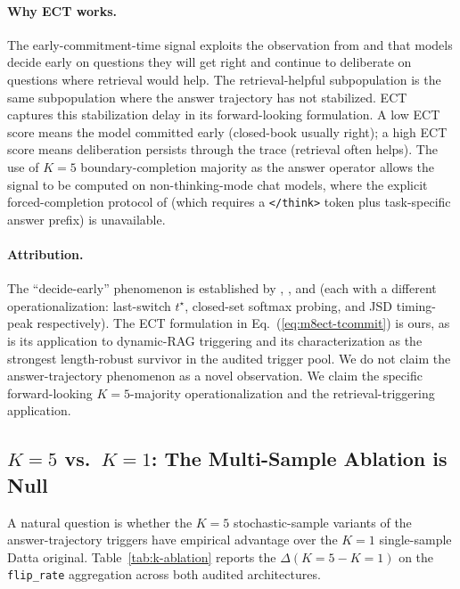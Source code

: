 \documentclass[11pt]{article}
\begin{document}
\paragraph{Why ECT works.} The early-commitment-time signal exploits the
observation from \citet{Datta_DecideEarlyExplainLater} and
\citet{Wang_ChainOfProbeCoTStepByStep} that models decide early on questions
they will get right and continue to deliberate on questions where retrieval
would help. The retrieval-helpful subpopulation is the same subpopulation
where the answer trajectory has not stabilized. ECT captures this
stabilization delay in its forward-looking formulation. A low ECT score
means the model committed early (closed-book usually right); a high ECT
score means deliberation persists through the trace (retrieval often helps).
The use of $K{=}5$ boundary-completion majority as the answer operator
allows the signal to be computed on non-thinking-mode chat models, where the
explicit forced-completion protocol of
\citet{Datta_DecideEarlyExplainLater} (which requires a \texttt{</think>}
token plus task-specific answer prefix) is unavailable.

\paragraph{Attribution.} The ``decide-early'' phenomenon is established by
\citet{Datta_DecideEarlyExplainLater}, \citet{Wang_ChainOfProbeCoTStepByStep},
and \citet{Chen_DynamicInstabilityLLMReasoning} (each with a different
operationalization: last-switch $t^\star$, closed-set softmax probing, and
JSD timing-peak respectively). The ECT formulation in
Eq.~(\ref{eq:m8ect-tcommit}) is ours, as is its application to dynamic-RAG
triggering and its characterization as the strongest length-robust survivor
in the audited trigger pool. We do not claim the answer-trajectory
phenomenon as a novel observation. We claim the specific forward-looking
$K{=}5$-majority operationalization and the retrieval-triggering application.

\subsection{$K{=}5$ vs.\ $K{=}1$: The Multi-Sample Ablation is Null}
\label{sec:results-ablation}

A natural question is whether the $K{=}5$ stochastic-sample variants of the
answer-trajectory triggers have empirical advantage over the $K{=}1$
single-sample Datta original. Table~\ref{tab:k-ablation} reports the
$\Delta(K{=}5 - K{=}1)$ on the \texttt{flip\_rate} aggregation across both
audited architectures.
\end{document}
